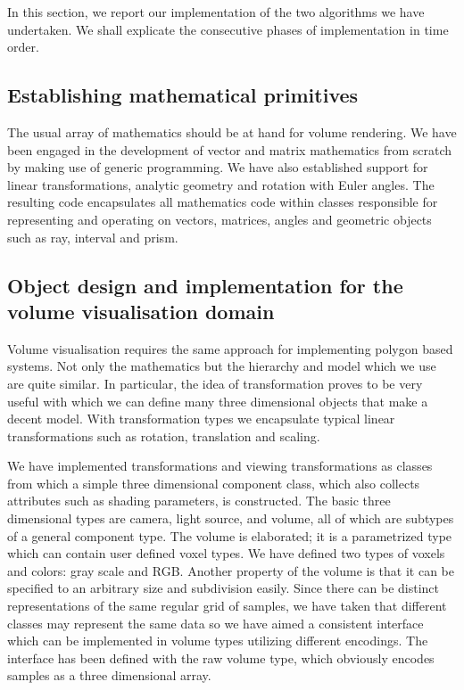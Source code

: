 \documentclass[a4paper,12pt]{article}
\begin{document}
In this section, we report our implementation of the two algorithms
we have undertaken. We shall explicate the consecutive phases of
implementation in time order.

\subsection{Establishing mathematical primitives}
 The usual array of mathematics should be at hand for volume
 rendering. We have been engaged in the development of vector and
 matrix mathematics from scratch by making use of generic programming.
 We have also established support for linear transformations, analytic
 geometry and rotation with Euler angles. The resulting code
 encapsulates all mathematics code within classes responsible for
 representing and operating on vectors, matrices, angles and
 geometric objects such as ray, interval and prism.

\subsection{Object design and implementation for the volume visualisation
  domain}
 Volume visualisation requires the same approach for implementing
 polygon based systems. Not only the mathematics but the hierarchy and
 model which we use are quite similar. In particular, the idea of
 transformation proves to be very useful with which we can define many
 three dimensional objects that make a decent model. With
 transformation types we encapsulate typical linear transformations
 such as rotation, translation and scaling.

 We have implemented transformations and viewing transformations as
 classes from which a simple three dimensional component class,
 which also collects attributes such as shading parameters, is
 constructed. The basic three dimensional types are camera, light
 source, and volume, all of which are subtypes of a general component
 type. The volume is elaborated; it is a parametrized type which can
 contain user defined voxel types. We have defined two types of voxels
 and colors: gray scale and RGB. Another property of the volume is
 that it can be specified to an arbitrary size and subdivision easily.
 Since there can be distinct representations of the same regular grid
 of samples, we have taken that different classes may represent the
 same data so we have aimed a consistent interface which can be
 implemented in volume types utilizing different encodings. The
 interface has been defined with the raw volume type, which obviously
 encodes samples as a three dimensional array.
 
\end{document}
